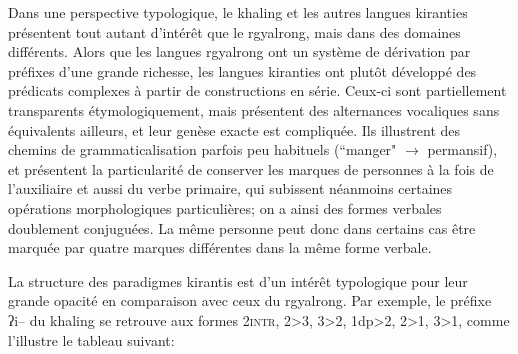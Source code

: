 \documentclass[oldfontcommands,oneside,a4paper,11pt]{memoir}
\newcommand{\ipa}[1]{{\phon #1}} %
\begin{document}
Dans une perspective typologique, le khaling et les autres langues kiranties présentent tout autant d'intérêt que le rgyalrong, mais dans des domaines différents. Alors que les langues rgyalrong ont un système de dérivation par préfixes  d'une grande richesse, les langues kiranties ont plutôt développé des prédicats complexes à partir de constructions en série. Ceux-ci sont partiellement transparents étymologiquement, mais présentent des alternances vocaliques sans équivalents ailleurs, et leur genèse exacte est compliquée. Ils illustrent des chemins de grammaticalisation parfois peu habituels (``manger" $\rightarrow$ permansif), et présentent la particularité de conserver les marques de personnes à la fois de l'auxiliaire et aussi du verbe primaire, qui subissent néanmoins certaines opérations morphologiques particulières; on a ainsi des formes verbales doublement conjuguées. La même personne peut donc dans certains cas être marquée par quatre marques différentes dans la même forme verbale.


La structure des paradigmes kirantis est d'un intérêt typologique pour leur grande opacité en comparaison avec ceux du rgyalrong. Par exemple, le préfixe \ipa{ʔi--} du khaling se retrouve aux formes \textsc{2intr}, 2>3, 3>2, 1dp>2, 2>1, 3>1, comme l'illustre le tableau suivant:
\end{document}
